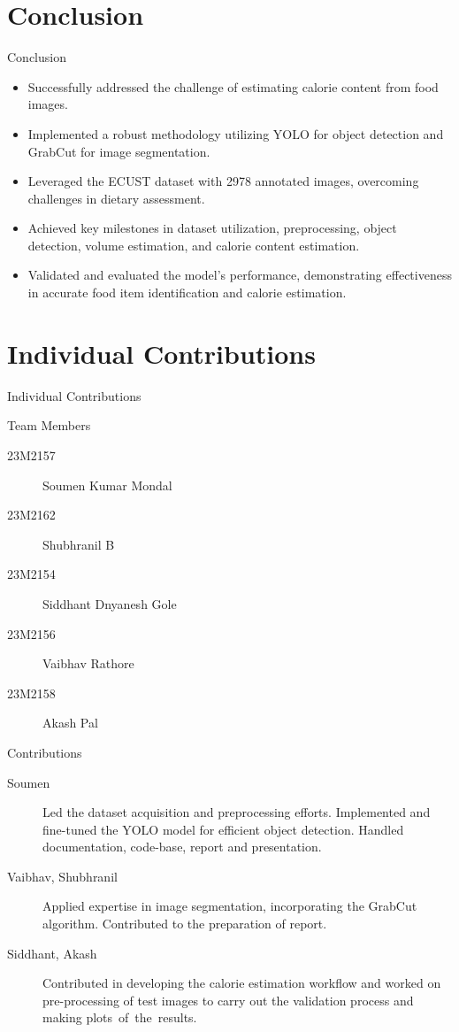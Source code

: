 \documentclass{beamer}
\begin{document}
	\section{Conclusion}
	\begin{frame}{Conclusion}
		\begin{block}{}
			\begin{itemize}
				\item Successfully addressed the challenge of estimating calorie content from food images.
				\item Implemented a robust methodology utilizing YOLO for object detection and GrabCut for image segmentation.
				\item Leveraged the ECUST dataset with 2978 annotated images, overcoming challenges in dietary assessment.\pause
				\item Achieved key milestones in dataset utilization, preprocessing, object detection, volume estimation, and calorie content estimation.
				\item Validated and evaluated the model's performance, demonstrating effectiveness in accurate food item identification and calorie estimation.
			\end{itemize}
		\end{block}
	\end{frame}
	
	\section{Individual Contributions}
	\begin{frame}{Individual Contributions}
		\begin{block}{Team Members}\scriptsize
			\begin{description}
				\item [23M2157] Soumen Kumar Mondal
				\item [23M2162] Shubhranil B
				\item [23M2154] Siddhant Dnyanesh Gole
				\item [23M2156] Vaibhav Rathore
				\item [23M2158] Akash Pal
			\end{description}
		\end{block}
		\begin{block}{Contributions}\scriptsize
			\begin{description}
				\item [Soumen] Led the dataset acquisition and preprocessing efforts. Implemented and fine-tuned the YOLO model for efficient object detection. Handled documentation, code-base, report and presentation.
				\item [Vaibhav, Shubhranil] Applied expertise in image segmentation, incorporating the GrabCut algorithm. Contributed to the preparation of report.
				\item [Siddhant, Akash] Contributed in developing the calorie estimation workflow and worked on pre-processing of test images to carry out the validation process and making plots of the results.
			\end{description}
		\end{block}
	\end{frame}
	
\end{document}

